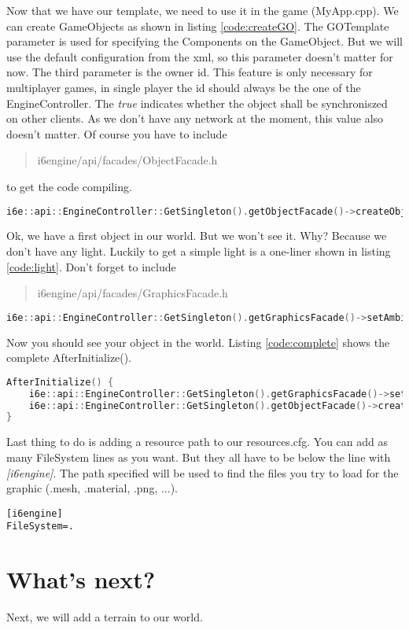 \documentclass{article}
\begin{document}
Now that we have our template, we need to use it in the game (MyApp.cpp). We can create GameObjects as shown in listing \ref{code:createGO}. The GOTemplate parameter is used for specifying the Components on the GameObject. But we will use the default configuration from the xml, so this parameter doesn't matter for now. The third parameter is the owner id. This feature is only necessary for multiplayer games, in single player the id should always be the one of the EngineController. The \textit{true} indicates whether the object shall be synchroniszed on other clients. As we don't have any network at the moment, this value also doesn't matter. Of course you have to include \begin{quote}i6engine/api/facades/ObjectFacade.h\end{quote} to get the code compiling.
\begin{lstlisting}[language=C++, style=basic, caption={creating objects}, label=code:createGO]
i6e::api::EngineController::GetSingleton().getObjectFacade()->createObject("Tutorial", i6e::api::objects::GOTemplate(), i6e::api::EngineController::GetSingleton().getUuid(), true);
\end{lstlisting}
Ok, we have a first object in our world. But we won't see it. Why? Because we don't have any light. Luckily to get a simple light is a one-liner shown in listing \ref{code:light}. Don't forget to include \begin{quote}i6engine/api/facades/GraphicsFacade.h\end{quote}
\begin{lstlisting}[language=C++, style=basic, caption={adding lights}, label=code:light]
i6e::api::EngineController::GetSingleton().getGraphicsFacade()->setAmbientLight(1.0, 1.0, 1.0);
\end{lstlisting}
Now you should see your object in the world. Listing \ref{code:complete} shows the complete AfterInitialize().
\begin{lstlisting}[language=C++, style=basic, caption={AfterInitialize()}, label=code:complete]
AfterInitialize() {
	i6e::api::EngineController::GetSingleton().getGraphicsFacade()->setAmbientLight(1.0, 1.0, 1.0);
	i6e::api::EngineController::GetSingleton().getObjectFacade()->createObject("Tutorial", i6e::api::objects::GOTemplate(), i6e::api::EngineController::GetSingleton().getUuid(), true);
}
\end{lstlisting}

Last thing to do is adding a resource path to our resources.cfg. You can add as many FileSystem lines as you want. But they all have to be below the line with \textit{[i6engine]}. The path specified will be used to find the files you try to load for the graphic (.mesh, .material, .png, ...).
\begin{lstlisting}[style=basic, caption={resource.cfg}, label=code:resourcecfg]
[i6engine]
FileSystem=.
\end{lstlisting}

\section{What's next?}

Next, we will add a terrain to our world.
\end{document}
